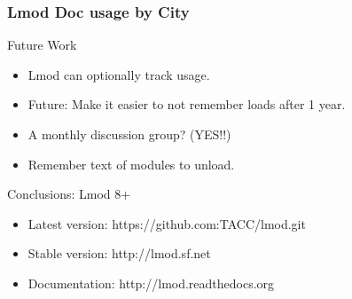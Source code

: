 \documentclass{beamer}
\begin{document}
\begin{frame}[fragile]
    \frametitle{Lmod Doc usage by City}
\end{frame}

\begin{frame}{Future Work}
  \begin{itemize}
    \item Lmod can optionally track usage.
    \item Future: Make it easier to not remember loads after 1 year.
    \item A monthly discussion group? (YES!!)
    \item Remember text of modules to unload.
  \end{itemize}
\end{frame}

\begin{frame}{Conclusions: Lmod 8+}
  \begin{itemize}
    \item Latest version: https://github.com:TACC/lmod.git
    \item Stable version: http://lmod.sf.net
    \item Documentation:  http://lmod.readthedocs.org
  \end{itemize}
\end{frame}
\end{document}
